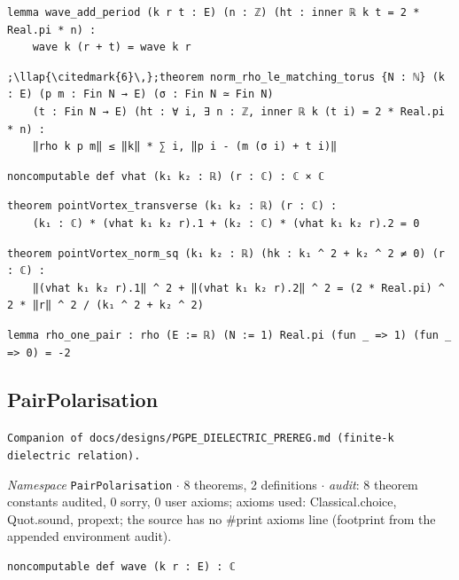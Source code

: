 \begin{lstlisting}[style=leancat]
lemma wave_add_period (k r t : E) (n : ℤ) (ht : inner ℝ k t = 2 * Real.pi * n) :
    wave k (r + t) = wave k r
\end{lstlisting}

\begin{lstlisting}[style=leancat]
;\llap{\citedmark{6}\,};theorem norm_rho_le_matching_torus {N : ℕ} (k : E) (p m : Fin N → E) (σ : Fin N ≃ Fin N)
    (t : Fin N → E) (ht : ∀ i, ∃ n : ℤ, inner ℝ k (t i) = 2 * Real.pi * n) :
    ‖rho k p m‖ ≤ ‖k‖ * ∑ i, ‖p i - (m (σ i) + t i)‖
\end{lstlisting}

\begin{lstlisting}[style=leancat]
noncomputable def vhat (k₁ k₂ : ℝ) (r : ℂ) : ℂ × ℂ
\end{lstlisting}

\begin{lstlisting}[style=leancat]
theorem pointVortex_transverse (k₁ k₂ : ℝ) (r : ℂ) :
    (k₁ : ℂ) * (vhat k₁ k₂ r).1 + (k₂ : ℂ) * (vhat k₁ k₂ r).2 = 0
\end{lstlisting}

\begin{lstlisting}[style=leancat]
theorem pointVortex_norm_sq (k₁ k₂ : ℝ) (hk : k₁ ^ 2 + k₂ ^ 2 ≠ 0) (r : ℂ) :
    ‖(vhat k₁ k₂ r).1‖ ^ 2 + ‖(vhat k₁ k₂ r).2‖ ^ 2 = (2 * Real.pi) ^ 2 * ‖r‖ ^ 2 / (k₁ ^ 2 + k₂ ^ 2)
\end{lstlisting}

\begin{lstlisting}[style=leancat]
lemma rho_one_pair : rho (E := ℝ) (N := 1) Real.pi (fun _ => 1) (fun _ => 0) = -2
\end{lstlisting}

\subsection{PairPolarisation}\label{appA:PairPolarisation}
{\footnotesize\raggedright\texttt{Companion of docs/\allowbreak{}designs/\allowbreak{}PGPE\_\allowbreak{}DIELECTRIC\_\allowbreak{}PREREG.\allowbreak{}md (finite-\allowbreak{}k dielectric relation).\allowbreak{}}\par}
{\footnotesize\raggedright\emph{Namespace} \texttt{PairPolarisation} $\cdot$ 8 theorems, 2 definitions $\cdot$ \emph{audit}: 8 theorem constants audited, 0 sorry, 0 user axioms; axioms used: Classical.choice, Quot.sound, propext; the source has no \#print axioms line (footprint from the appended environment audit).\par}
\vspace{1pt}
\begin{lstlisting}[style=leancat]
noncomputable def wave (k r : E) : ℂ
\end{lstlisting}

